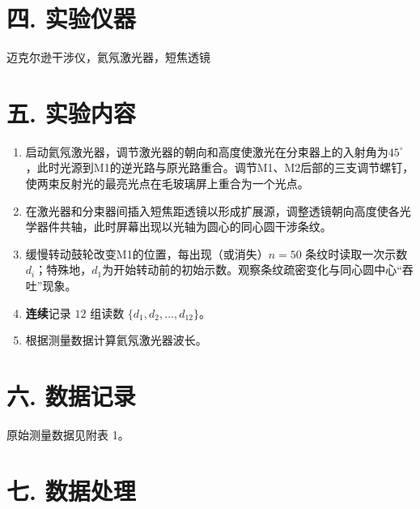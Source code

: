 \documentclass[12pt,a4paper]{article}
\begin{document}
	\section*{\textbf{{四. 实验仪器}}}
	迈克尔逊干涉仪，氦氖激光器，短焦透镜

	\section*{\textbf{{五. 实验内容}}}

	\begin{enumerate}
		\item 启动氦氖激光器，调节激光器的朝向和高度使激光在分束器上的入射角为$45^{\circ}$，此时光源到M1的逆光路与原光路重合。调节M1、M2后部的三支调节螺钉，使两束反射光的最亮光点在毛玻璃屏上重合为一个光点。
		\item 在激光器和分束器间插入短焦距透镜以形成扩展源，调整透镜朝向高度使各光学器件共轴，此时屏幕出现以光轴为圆心的同心圆干涉条纹。
		\item 缓慢转动鼓轮改变M1的位置，每出现（或消失）$n=50$ 条纹时读取一次示数 $d_i$；特殊地，$d_1$为开始转动前的初始示数。观察条纹疏密变化与同心圆中心“吞吐”现象。
		\item \textbf{连续}记录 $12$ 组读数 $\{d_1,d_2,\dots,d_{12}\}$。
		\item 根据测量数据计算氦氖激光器波长。
	
	\end{enumerate}
	\section*{\textbf{{六. 数据记录}}}
	
	原始测量数据见附表 1。

	\section*{\textbf{{七. 数据处理}}}
\end{document}
